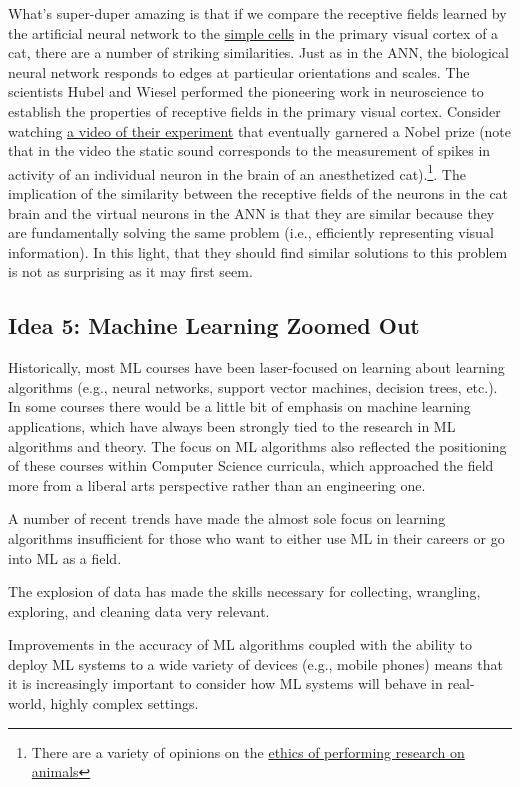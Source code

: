 \documentclass[assignment01_Solutions]{subfiles}
\begin{document}
What's super-duper amazing is that if we compare the receptive fields learned by the artificial neural network to the \href{https://en.wikipedia.org/wiki/Simple_cell}{simple cells} in the primary visual cortex of a cat, there are a number of striking similarities.  Just as in the ANN, the biological neural network responds to edges at particular orientations and scales.  The scientists Hubel and Wiesel performed the pioneering work in neuroscience to establish the properties of receptive fields in the primary visual cortex.  Consider watching \href{https://www.youtube.com/watch?v=8VdFf3egwfg}{a video of their experiment} that eventually garnered a Nobel prize (note that in the video the static sound corresponds to the measurement of spikes in activity of an individual neuron in the brain of an anesthetized cat).\footnote{There are a variety of opinions on the \href{https://en.wikipedia.org/wiki/Animal_testing\#Ethics}{ethics of performing research on animals}}. The implication of the similarity between the receptive fields of the neurons in the cat brain and the virtual neurons in the ANN is that they are similar because they are fundamentally solving the same problem (i.e., efficiently representing visual information).  In this light, that they should find similar solutions to this problem is not as surprising as it may first seem.


\subsection*{Idea 5: Machine Learning Zoomed Out}

Historically, most ML courses have been laser-focused on learning about learning algorithms (e.g., neural networks, support vector machines, decision trees, etc.).  In some courses there would be a little bit of emphasis on machine learning applications, which have always been strongly tied to the research in ML algorithms and theory.  The focus on ML algorithms also reflected the positioning of these courses within Computer Science curricula, which approached the field more from a liberal arts perspective rather than an engineering one.

A number of recent trends have made the almost sole focus on learning algorithms insufficient for those who want to either use ML in their careers or go into ML as a field.
\be
\item The explosion of data has made the skills necessary for collecting, wrangling, exploring, and cleaning data very relevant.
\item Improvements in the accuracy of ML algorithms coupled with the ability to deploy ML systems to a wide variety of devices (e.g., mobile phones) means that it is increasingly important to consider how ML systems will behave in real-world, highly complex settings.
\ee
\end{document}
